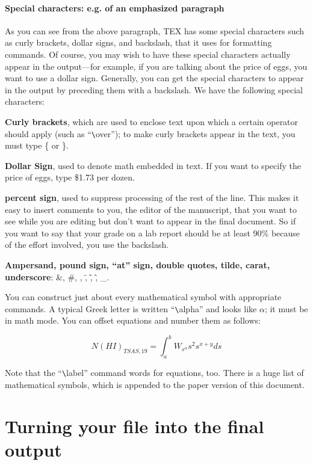 \paragraph{Special characters: e.g. of an emphasized paragraph}
	As you can see from the above paragraph, TEX has some special
characters such as curly brackets, dollar signs, and backslash, that it
uses for formatting commands. Of course, you may wish to have these
special characters actually appear in the output---for example, if you
are talking about the price of eggs, you want to use a dollar sign.
Generally, you can get the special characters to appear in the output by
preceding them with a backslash. We have the following special
characters:

	{\bf Curly brackets}, which are used to enclose text upon which
a certain operator should apply (such as ``\verb"\"over''); to make curly
brackets appear in the text, you must type \{ or \}.

	{\bf Dollar Sign}, used to denote math embedded in text. If you
want to specify the price of eggs, type \$1.73 per dozen.

	{\bf percent sign}, used to suppress processing of the rest of
the line. This makes it easy to insert comments to you, the editor of
the manuscript, that you want to see while you are editing but don't
want to appear in the final document. So if you want to say that your
grade on a lab report should be at least 90\% because of the effort
involved, you use the backslash.

	{\bf Ampersand, pound sign, ``at'' sign, double quotes, tilde,
carat, underscore}: \&, \#, \@, \", \~, \^, \_.

	You can construct just about every mathematical symbol with
appropriate commands. A typical Greek letter is written ``\verb"\"alpha'' and
looks like $\alpha$; it must be in math mode. You can offset equations
and number them as follows:

\begin{equation}
\label{AA1}
N(HI)_{TSAS, 19} = \int_a^b W_{s^\alpha} s^2 s^{x+y} ds
\end{equation}

\noindent Note that the ``\verb"\"label'' command words for equations, too.
There is a huge list of mathematical symbols, which is appended to the
paper version of this document.

\section{Turning your file into the final output} \label{nr2}

